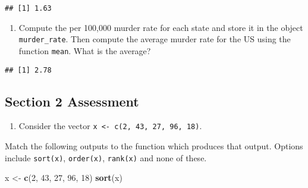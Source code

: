 \documentclass[]{article}
\newenvironment{Shaded}{\begin{snugshade}}{\end{snugshade}}
\newcommand{\CommentTok}[1]{\textcolor[rgb]{0.56,0.35,0.01}{\textit{#1}}}
\newcommand{\DecValTok}[1]{\textcolor[rgb]{0.00,0.00,0.81}{#1}}
\newcommand{\KeywordTok}[1]{\textcolor[rgb]{0.13,0.29,0.53}{\textbf{#1}}}
\newcommand{\NormalTok}[1]{#1}
\newcommand{\OperatorTok}[1]{\textcolor[rgb]{0.81,0.36,0.00}{\textbf{#1}}}
\newcommand{\StringTok}[1]{\textcolor[rgb]{0.31,0.60,0.02}{#1}}
\providecommand{\tightlist}{%
  \setlength{\itemsep}{0pt}\setlength{\parskip}{0pt}}
\begin{document}
\begin{verbatim}
## [1] 1.63
\end{verbatim}

\begin{enumerate}
\def\labelenumi{\arabic{enumi}.}
\setcounter{enumi}{2}
\tightlist
\item
  Compute the per 100,000 murder rate for each state and store it in the
  object \texttt{murder\_rate}. Then compute the average murder rate for
  the US using the function \texttt{mean}. What is the average?
\end{enumerate}

\begin{Shaded}
\end{Shaded}

\begin{verbatim}
## [1] 2.78
\end{verbatim}

\hypertarget{section-2-assessment}{%
\subsection{Section 2 Assessment}\label{section-2-assessment}}

\begin{enumerate}
\def\labelenumi{\arabic{enumi}.}
\tightlist
\item
  Consider the vector
  \texttt{x\ \textless{}-\ c(2,\ 43,\ 27,\ 96,\ 18)}.
\end{enumerate}

Match the following outputs to the function which produces that output.
Options include \texttt{sort(x)}, \texttt{order(x)}, \texttt{rank(x)}
and none of these.

\begin{Shaded}
\begin{Highlighting}[]
\NormalTok{x <-}\StringTok{ }\KeywordTok{c}\NormalTok{(}\DecValTok{2}\NormalTok{, }\DecValTok{43}\NormalTok{, }\DecValTok{27}\NormalTok{, }\DecValTok{96}\NormalTok{, }\DecValTok{18}\NormalTok{)}
\KeywordTok{sort}\NormalTok{(x)}
\end{Highlighting}
\end{Shaded}
\end{document}
